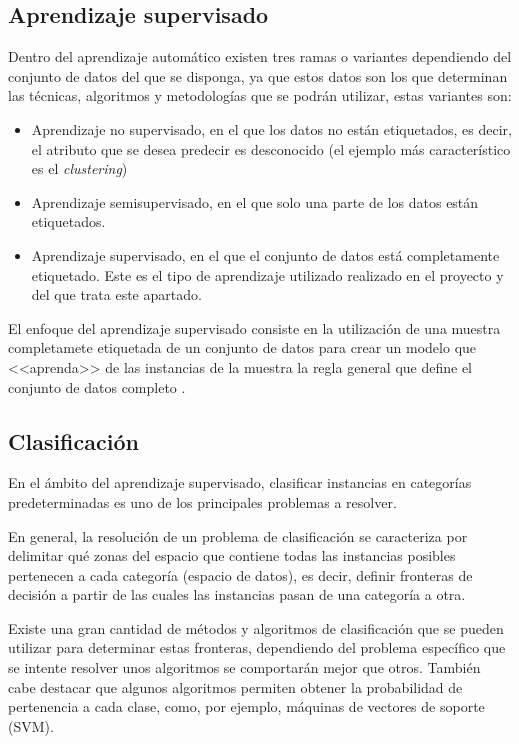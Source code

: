 \subsection{Aprendizaje supervisado}

Dentro del aprendizaje automático existen tres ramas o variantes dependiendo del
conjunto de datos del que se disponga, ya que estos datos son los que determinan
las técnicas, algoritmos y metodologías que se podrán utilizar, estas variantes
son:
\begin{itemize}
    \item Aprendizaje no supervisado, en el que los datos no están
    etiquetados, es decir, el atributo que se desea predecir es desconocido (el
    ejemplo más característico es el \textit{clustering})
    \item Aprendizaje semisupervisado, en el que solo una parte de los datos
    están etiquetados.
    \item Aprendizaje supervisado, en el que el conjunto de datos está
    completamente etiquetado. Este es el tipo de aprendizaje utilizado realizado
    en el proyecto y del que trata este apartado.
\end{itemize}

El enfoque del aprendizaje supervisado consiste en la utilización de una muestra
completamete etiquetada de un conjunto de datos para crear un modelo que
<<aprenda>> de las instancias de la muestra la regla general que define el
conjunto de datos completo \cite{learned2014introduction}.

\subsection{Clasificación}

En el ámbito del aprendizaje supervisado, clasificar instancias en categorías
predeterminadas es uno de los principales problemas a resolver.

En general, la resolución de un problema de clasificación se caracteriza por
delimitar qué zonas del espacio que contiene todas las instancias posibles
pertenecen a cada categoría (espacio de datos), es decir, definir fronteras de
decisión a partir de las cuales las instancias pasan de una categoría a otra.

Existe una gran cantidad de métodos y algoritmos de clasificación que se pueden
utilizar para determinar estas fronteras, dependiendo del problema específico
que se intente resolver unos algoritmos se comportarán mejor que otros. También
cabe destacar que algunos algoritmos permiten obtener la probabilidad de
pertenencia a cada clase, como, por ejemplo, máquinas de vectores de soporte
(SVM).

